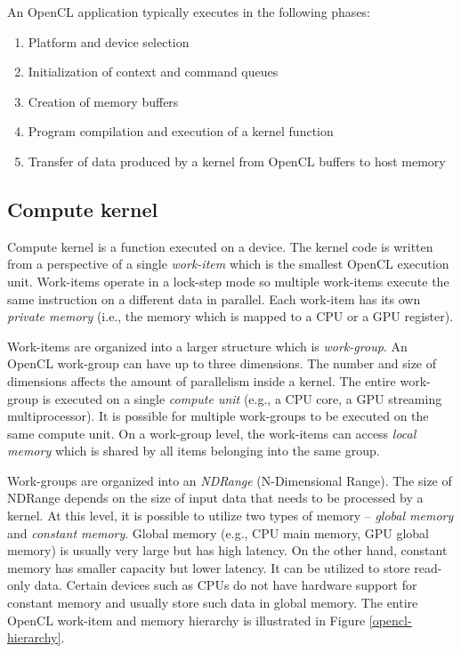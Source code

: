 \documentclass[
  digital,     %
  oneside,     %
  nosansbold,  %
  nocolorbold, %
  lof,         %
  lot,         %
  nocover
]{fithesis4}
\begin{document}
An OpenCL application typically executes in the following phases:
\begin{enumerate}
    \item Platform and device selection
    \item Initialization of context and command queues
    \item Creation of memory buffers
    \item Program compilation and execution of a kernel function
    \item Transfer of data produced by a kernel from OpenCL buffers to host memory
\end{enumerate}

\subsection{Compute kernel}
Compute kernel is a function executed on a device. The kernel code is written from a perspective of a single \textit{work-item} which is the smallest OpenCL execution unit. Work-items operate in a lock-step mode so multiple work-items execute the same instruction on a different data in parallel. Each work-item has its own \textit{private memory} (i.e., the memory which is mapped to a CPU or a GPU register).

Work-items are organized into a larger structure which is \textit{work-group}. An OpenCL work-group can have up to three dimensions. The number and size of dimensions affects the amount of parallelism inside a kernel. The entire work-group is executed on a single \textit{compute unit} (e.g., a CPU core, a GPU streaming multiprocessor). It is possible for multiple work-groups to be executed on the same compute unit. On a work-group level, the work-items can access \textit{local memory} which is shared by all items belonging into the same group.

Work-groups are organized into an \textit{NDRange} (N-Dimensional Range). The size of NDRange depends on the size of input data that needs to be processed by a kernel. At this level, it is possible to utilize two types of memory -- \textit{global memory} and \textit{constant memory}. Global memory (e.g., CPU main memory, GPU global memory) is usually very large but has high latency. On the other hand, constant memory has smaller capacity but lower latency. It can be utilized to store read-only data. Certain devices such as CPUs do not have hardware support for constant memory and usually store such data in global memory. The entire OpenCL work-item and memory hierarchy is illustrated in Figure \ref{opencl-hierarchy}.
\end{document}
